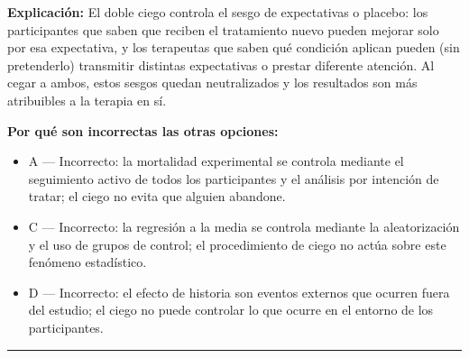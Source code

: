 \documentclass[12pt,a4paper]{article}
\begin{document}
\noindent\textbf{\color{azul}Explicación:} El doble ciego controla el sesgo de expectativas o placebo: los participantes que saben que reciben el tratamiento nuevo pueden mejorar solo por esa expectativa, y los terapeutas que saben qué condición aplican pueden (sin pretenderlo) transmitir distintas expectativas o prestar diferente atención. Al cegar a ambos, estos sesgos quedan neutralizados y los resultados son más atribuibles a la terapia en sí.

\noindent\textbf{\color{gris}Por qué son incorrectas las otras opciones:}
\begin{itemize}
  \item {\small A — Incorrecto: la mortalidad experimental se controla mediante el seguimiento activo de todos los participantes y el análisis por intención de tratar; el ciego no evita que alguien abandone.}
  \item {\small C — Incorrecto: la regresión a la media se controla mediante la aleatorización y el uso de grupos de control; el procedimiento de ciego no actúa sobre este fenómeno estadístico.}
  \item {\small D — Incorrecto: el efecto de historia son eventos externos que ocurren fuera del estudio; el ciego no puede controlar lo que ocurre en el entorno de los participantes.}
\end{itemize}
\vspace{8pt}\hrule\vspace{10pt}
\end{document}
